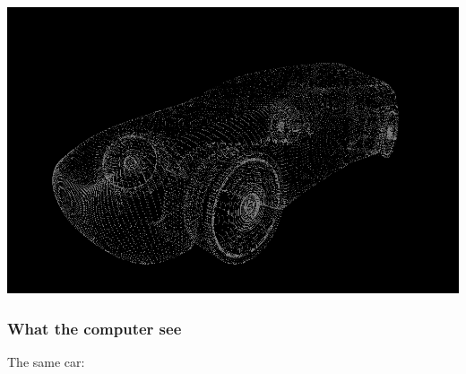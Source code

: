 \documentclass[11pt]{article}
\begin{document}
\begin{center}
\includegraphics[width=.9\linewidth]{./images/Presentation_car_points.png}
\end{center}

\subsubsection*{What the computer see}
\label{sec:org18de491}
The same car:
\end{document}
